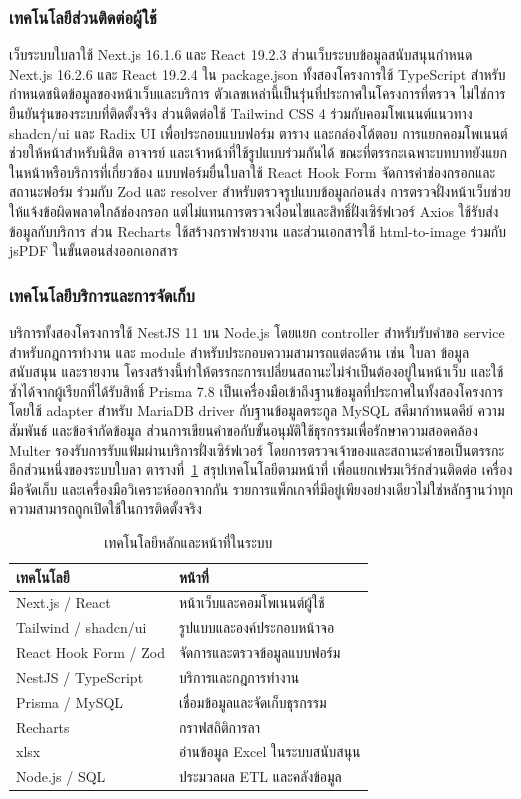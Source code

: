 \subsubsection{เทคโนโลยีส่วนติดต่อผู้ใช้}
เว็บระบบใบลาใช้ Next.js 16.1.6 และ React 19.2.3 ส่วนเว็บระบบข้อมูลสนับสนุนกำหนด Next.js 16.2.6 และ React 19.2.4 ใน package.json ทั้งสองโครงการใช้ TypeScript สำหรับกำหนดชนิดข้อมูลของหน้าเว็บและบริการ ตัวเลขเหล่านี้เป็นรุ่นที่ประกาศในโครงการที่ตรวจ ไม่ใช่การยืนยันรุ่นของระบบที่ติดตั้งจริง \cite{repo}
ส่วนติดต่อใช้ Tailwind CSS 4 ร่วมกับคอมโพเนนต์แนวทาง shadcn/ui และ Radix UI เพื่อประกอบแบบฟอร์ม ตาราง และกล่องโต้ตอบ การแยกคอมโพเนนต์ช่วยให้หน้าสำหรับนิสิต อาจารย์ และเจ้าหน้าที่ใช้รูปแบบร่วมกันได้ ขณะที่ตรรกะเฉพาะบทบาทยังแยกในหน้าหรือบริการที่เกี่ยวข้อง
แบบฟอร์มยื่นใบลาใช้ React Hook Form จัดการค่าช่องกรอกและสถานะฟอร์ม ร่วมกับ Zod และ resolver สำหรับตรวจรูปแบบข้อมูลก่อนส่ง การตรวจฝั่งหน้าเว็บช่วยให้แจ้งข้อผิดพลาดใกล้ช่องกรอก แต่ไม่แทนการตรวจเงื่อนไขและสิทธิ์ฝั่งเซิร์ฟเวอร์ Axios ใช้รับส่งข้อมูลกับบริการ ส่วน Recharts ใช้สร้างกราฟรายงาน และส่วนเอกสารใช้ html-to-image ร่วมกับ jsPDF ในขั้นตอนส่งออกเอกสาร
\subsubsection{เทคโนโลยีบริการและการจัดเก็บ}
บริการทั้งสองโครงการใช้ NestJS 11 บน Node.js โดยแยก controller สำหรับรับคำขอ service สำหรับกฎการทำงาน และ module สำหรับประกอบความสามารถแต่ละด้าน เช่น ใบลา ข้อมูลสนับสนุน และรายงาน โครงสร้างนี้ทำให้ตรรกะการเปลี่ยนสถานะไม่จำเป็นต้องอยู่ในหน้าเว็บ และใช้ซ้ำได้จากผู้เรียกที่ได้รับสิทธิ์
Prisma 7.8 เป็นเครื่องมือเข้าถึงฐานข้อมูลที่ประกาศในทั้งสองโครงการ โดยใช้ adapter สำหรับ MariaDB driver กับฐานข้อมูลตระกูล MySQL สคีมากำหนดคีย์ ความสัมพันธ์ และข้อจำกัดข้อมูล ส่วนการเขียนคำขอกับขั้นอนุมัติใช้ธุรกรรมเพื่อรักษาความสอดคล้อง Multer รองรับการรับแฟ้มผ่านบริการฝั่งเซิร์ฟเวอร์ โดยการตรวจเจ้าของและสถานะคำขอเป็นตรรกะอีกส่วนหนึ่งของระบบใบลา
ตารางที่~\ref{tab:tech-stack} สรุปเทคโนโลยีตามหน้าที่ เพื่อแยกเฟรมเวิร์กส่วนติดต่อ เครื่องมือจัดเก็บ และเครื่องมือวิเคราะห์ออกจากกัน รายการแพ็กเกจที่มีอยู่เพียงอย่างเดียวไม่ใช่หลักฐานว่าทุกความสามารถถูกเปิดใช้ในการติดตั้งจริง
\begin{table}[ht]
\caption{เทคโนโลยีหลักและหน้าที่ในระบบ}\label{tab:tech-stack}
\centering
\begin{tabularx}{\columnwidth}{|p{30mm}|X|}
\hline
เทคโนโลยี & หน้าที่ \\ \hline
Next.js / React & หน้าเว็บและคอมโพเนนต์ผู้ใช้ \\ \hline
Tailwind / shadcn/ui & รูปแบบและองค์ประกอบหน้าจอ \\ \hline
React Hook Form / Zod & จัดการและตรวจข้อมูลแบบฟอร์ม \\ \hline
NestJS / TypeScript & บริการและกฎการทำงาน \\ \hline
Prisma / MySQL & เชื่อมข้อมูลและจัดเก็บธุรกรรม \\ \hline
Recharts & กราฟสถิติการลา \\ \hline
xlsx & อ่านข้อมูล Excel ในระบบสนับสนุน \\ \hline
Node.js / SQL & ประมวลผล ETL และคลังข้อมูล \\ \hline
\end{tabularx}
\end{table}
